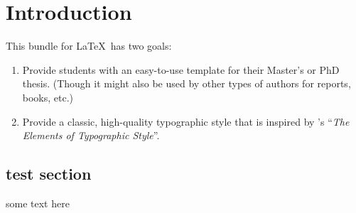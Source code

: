 \chapter{Introduction}\label{ch:introduction}
This bundle for \LaTeX\ has two goals:
\begin{enumerate}
    \item Provide students with an easy-to-use template for their
    Master's
    or PhD thesis. (Though it might also be used by other types of
    authors
    for reports, books, etc.)
    \item Provide a classic, high-quality typographic style that is
    inspired by \citeauthor{bringhurst:2002}'s ``\emph{The Elements of
    Typographic Style}''.
\end{enumerate}

\section{test section}
some text here
